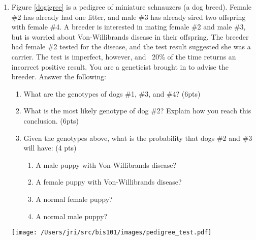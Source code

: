 \documentclass[]{article}
\begin{document}
\begin{enumerate}

\item Figure \ref{dogigree} is a pedigree of miniature schnauzers (a dog breed). Female \#2 has already had one litter, and male \#3 has already sired two offspring with female \#4. A breeder is interested in mating female \#2 and male \#3, but is worried about Von-Willibrands disease in their offspring. The breeder had female \#2 tested for the disease, and the test result suggested she was a carrier. The test is imperfect, however, and ~20\% of the time returns an incorrect positive result. You are a geneticist brought in to advise the breeder. Answer the following:

\begin{enumerate}
\item What are the genotypes of dogs \#1, \#3, and \#4? (6pts)
\item What is the most likely genotype of dog \#2? Explain how you reach this conclusion. (6pts)
\item Given the genotypes above, what is the probability that dogs \#2 and \#3 will have: (4 pts)
\begin{enumerate}
\item A male puppy with Von-Willibrands disease?
\item A female puppy with Von-Willibrands disease?
\item A normal female puppy?
\item A normal male puppy?
\end{enumerate}
\end{enumerate}

\begin{figure*}[h]
  \begin{center}
   \texttt{[image: /Users/jri/src/bis101/images/pedigree\_test.pdf]}
\label{dogigree}
\caption{A pedigree of miniature schnauzers. Filled symbols (square=male, circle=female) represent dogs with Von-Willibrands disease, a recessive X-linked disorder. Empty symbols are dogs with wild-type phenotypes.}
  \end{center}
\end{figure*}

\end{enumerate}
\end{document}
